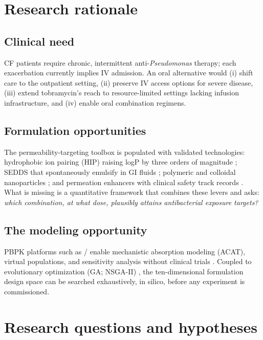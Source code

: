 \section{Research rationale}
\label{sec:rationale}

\subsection{Clinical need}
CF patients require chronic, intermittent anti-\textit{Pseudomonas} therapy; each exacerbation currently implies IV admission. An oral alternative would (i) shift care to the outpatient setting, (ii) preserve IV access options for severe disease, (iii) extend tobramycin's reach to resource-limited settings lacking infusion infrastructure, and (iv) enable oral combination regimens.

\subsection{Formulation opportunities}
The permeability-targeting toolbox is populated with validated technologies: hydrophobic ion pairing (HIP) raising logP by three orders of magnitude \citep{Asad2023, Griesser2017}; SEDDS that spontaneously emulsify in GI fluids \citep{Muhammad2022}; polymeric and colloidal nanoparticles \citep{Hill2019, BlancoCabra2022, Khaled2026}; and permeation enhancers with clinical safety track records \citep{Maher2009, Bohley2024}. What is missing is a quantitative framework that combines these levers and asks: \emph{which combination, at what dose, plausibly attains antibacterial exposure targets?}

\subsection{The modeling opportunity}
PBPK platforms such as / enable mechanistic absorption modeling (ACAT), virtual populations, and sensitivity analysis without clinical trials \citep{OSP2024, Willmann2007}. Coupled to evolutionary optimization (GA; NSGA-II) \citep{Holland1975, Deb2002, Scrucca2013}, the ten-dimensional formulation design space can be searched exhaustively, in silico, before any experiment is commissioned.

\section{Research questions and hypotheses}
\label{sec:hypotheses}


